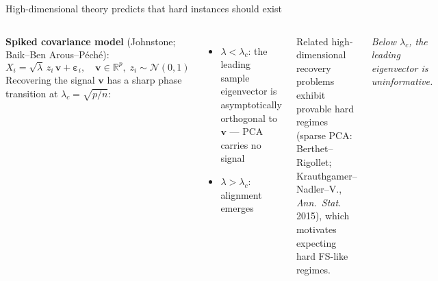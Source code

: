 \documentclass[aspectratio=169,10pt,dvipsnames]{beamer}
\begin{document}
\begin{frame}{High-dimensional theory predicts that hard instances should exist}
\begin{columns}[T]
\vspace{0.2cm}
\textbf{Spiked covariance model} (Johnstone; Baik--Ben Arous--P\'ech\'e):
\[
  X_i = \sqrt{\lambda}\,z_i\,\mathbf{v} + \boldsymbol{\varepsilon}_i,\quad
  \mathbf{v}\in\mathbb{R}^p,\; z_i\sim\mathcal{N}(0,1)
\]
Recovering the signal $\mathbf{v}$ has a sharp phase transition at
$\lambda_c = \sqrt{p/n}$:
\begin{itemize}
  \item $\lambda < \lambda_c$: the leading sample eigenvector is asymptotically
        orthogonal to $\mathbf{v}$ --- PCA carries no signal
  \item $\lambda > \lambda_c$: alignment emerges
\end{itemize}

\medskip
{\small Related high-dimensional recovery problems exhibit provable hard regimes
(sparse PCA: Berthet--Rigollet; Krauthgamer--Nadler--V., \emph{Ann.\ Stat.} 2015),
which motivates expecting hard FS-like regimes.}

\pause
{}
\centering
{}

\vspace{4pt}
{\small\textit{Below $\lambda_c$, the leading eigenvector is uninformative.}}
\end{columns}
\end{frame}
\end{document}
